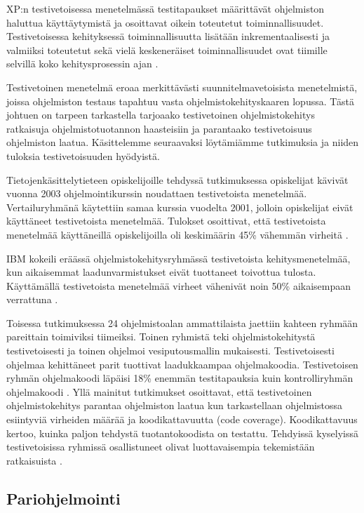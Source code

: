 \documentclass[finnish]{tktltiki2}
\theoremstyle{definition}
\theoremstyle{remark}
\begin{document}
{XP:n testivetoisessa menetelmässä testitapaukset määrittävät ohjelmiston haluttua käyttäytymistä ja osoittavat oikein toteutetut toiminnallisuudet. Testivetoisessa kehityksessä toiminnallisuutta lisätään inkrementaalisesti ja valmiiksi toteutetut sekä vielä keskeneräiset toiminnallisuudet ovat tiimille selvillä koko kehitysprosessin ajan \cite{EDW03}.

Testivetoinen menetelmä eroaa merkittävästi suunnitelmavetoisista menetel\-mistä, joissa ohjelmiston testaus tapahtuu vasta ohjelmistokehityskaaren lopussa. Tästä johtuen on tarpeen tarkastella tarjoaako testivetoinen ohjelmistokehitys ratkaisuja ohjelmistotuotannon haasteisiin ja parantaako testivetoisuus ohjelmiston laatua. Käsittelemme seuraavaksi löytämiämme tutkimuksia ja niiden tuloksia testivetoisuuden hyödyistä.

Tietojen\-käsittely\-tieteen opiskelijoille tehdyssä tutkimuksessa opiskelijat kävivät vuonna 2003 ohjelmointikurssin noudattaen testivetoista menetelmää. Vertailuryhmänä käytettiin samaa kurssia vuodelta 2001, jolloin opiskelijat eivät käyttäneet testivetoista menetelmää. Tulokset osoittivat, että testivetoista menetelmää käyttäneillä opiskelijoilla oli keskimäärin 45\% vähemmän virheitä \cite{EDW03}.

IBM kokeili eräässä ohjelmistokehitysryhmässä testivetoista kehitys\-menetelmää, kun aikaisemmat laadunvarmistukset eivät tuottaneet toivottua tulosta. Käyttä\-mällä testivetoista menetelmää virheet vähenivät noin 50\% aikaisempaan verrattuna \cite{MAW03}.

Toisessa tutkimuksessa 24 ohjelmistoalan ammattilaista jaettiin kahteen ryhmään pareittain toimiviksi tiimeiksi. Toinen ryhmistä teki ohjelmistokehitystä testivetoisesti ja toinen ohjelmoi vesiputousmallin mukaisesti. Testivetoisesti ohjelmaa kehittäneet parit tuottivat laadukkaampaa ohjelmakoodia. Testivetoisen ryhmän ohjelmakoodi läpäisi 18\% enemmän testitapauksia kuin kontrolliryhmän ohjelmakoodi \cite{GEW03}.
Yllä mainitut tutkimukset osoittavat, että testivetoinen ohjelmistokehitys parantaa ohjelmiston laatua kun tarkastellaan ohjelmistossa esiintyviä virheiden määrää ja koodikattavuutta (code coverage). Koodikattavuus kertoo, kuinka paljon tehdystä tuotantokoodista on testattu. Tehdyissä kyselyissä testivetoisissa ryhmissä osallistuneet olivat luottavaisempia tekemistään ratkaisuista \cite{GEW03}.

\subsection{Pariohjelmointi}

}
\end{document}
